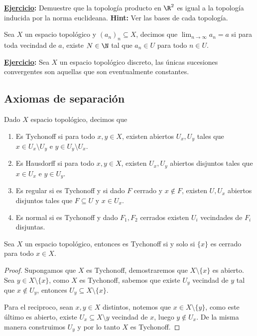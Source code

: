 \documentclass[11pt]{article}
\begin{document}
\noindent\textbf{\underline{Ejercicio}:} Demuestre que la topología producto en $\R^{2}$ es igual 
a la topología inducida por la norma euclideana. \textbf{Hint:} Ver las bases de cada topología.

\begin{dfn}
    Sea $X$ un espacio topológico y $(a_{n})_{n}\subseteq X$, decimos que 
    $\lim_{n\to\infty}a_{n}=a$ si para toda vecindad de $a$, existe $N\in\N$ tal que $a_{n}\in U$
    para todo $n\in U$.
\end{dfn}

\noindent\textbf{\underline{Ejercicio}:} Sea $X$ un espacio topológico discreto, las únicas 
sucesiones convergentes son aquellas que son eventualmente constantes.

\subsection{Axiomas de separación}

\noindent Dado $X$ espacio topológico, decimos que
\begin{enumerate}
    \item Es Tychonoff si para todo $x,y\in X$, existen abiertos $U_{x},U_{y}$ tales que 
    $x\in U_{x}\setminus U_{y}$ e $y\in U_{y}\setminus U_{x}$.

    \item Es Hausdorff si para todo $x,y\in X$, existen $U_{x},U_{y}$ abiertos disjuntos tales que
    $x\in U_{x}$ e $y\in U_{y}$.

    \item Es regular si es Tychonoff y si dado $F$ cerrado y $x\not\in F$, existen $U,U_{x}$
    abiertos disjuntos tales que $F\subseteq U$ y $x\in U_{x}$.

    \item Es normal si es Tychonoff y dado $F_{1},F_{2}$ cerrados existen $U_{i}$ vecindades de
    $F_{i}$ disjuntas.
\end{enumerate}

\begin{prop}
    Sea $X$ un espacio topológico, entonces es Tychonoff si y solo si $\{x\}$ es cerrado para 
    todo $x\in X$.
\end{prop}

\begin{proof}
    Supongamos que $X$ es Tychonoff, demostraremos que $X\setminus\{x\}$ es abierto. Sea 
    $y\in X\setminus\{x\}$, como $X$ es Tychonoff, sabemos que existe $U_{y}$ vecindad de $y$ tal
    que $x\not\in U_{y}$, entonces $U_{y}\subseteq X\setminus\{x\}$.

    \vspace{2mm}
    Para el reciproco, sean $x,y\in X$ distintos, notemos que $x\in X\setminus\{y\}$, como este 
    último es abierto, existe $U_{x}\subseteq X\setminus{y}$ vecindad de $x$, luego 
    $y\not\in U_{x}$. De la misma manera construimos $U_{y}$ y por lo tanto $X$ es Tychonoff.
\end{proof}
\end{document}
